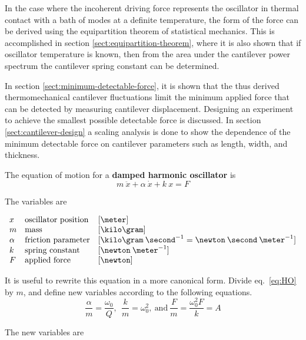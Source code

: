 In the case where the incoherent driving force represents the
oscillator in thermal contact with a bath of modes at a definite
temperature, the form of the force can be derived using the
equipartition theorem of statistical mechanics.  This is accomplished
in section \ref{sect:equipartition-theorem}, where it is also shown that if
oscillator temperature is known, then from the area under the cantilever
power spectrum the cantilever spring constant can be determined.

In section \ref{sect:minimum-detectable-force}, it is shown that the
thus derived thermomechanical cantilever fluctuations limit the
minimum applied force that can be detected by measuring cantilever
displacement.  Designing an experiment to achieve the smallest
possible detectable force is discussed.  In section
\ref{sect:cantilever-design} a scaling analysis is done to 
show the dependence of the minimum detectable force on cantilever
parameters such as length, width, and thickness.

\label{sect:equation-of-motion}

The equation of motion for a {\bf damped harmonic oscillator} is
\begin{equation}
m \: \ddot{x} + \alpha \: \dot{x} + k \: x = F
\label{eq:HO} 
\end{equation}

The variables are

\[
\begin{array}{lll}
 x & \mbox{oscillator position} & [\meter] \\ 
 m & \mbox{mass} & [\kilo \gram] \\
 \alpha & \mbox{friction parameter} & [\kilo \gram \: {\second}^{-1} = \newton \: \second \: {\meter}^{-1}] \\
 k & \mbox{spring constant} & [\newton \: {\meter}^{-1}] \\
 F & \mbox{applied force} & [\newton]
\end{array}
\]

It is useful to rewrite this equation in a more canonical form.
Divide eq.~\ref{eq:HO} by $m$, and define new variables according to
the following equations.
\begin{equation}
\frac{\alpha}{m} = \frac{\omega_0}{Q}, \: \: \frac{k}{m} = \omega_0^2, \: \mbox{and} \: \frac{F}{m} = \frac{\omega_0^2 F}{k} = A
\end{equation}

The new variables are

